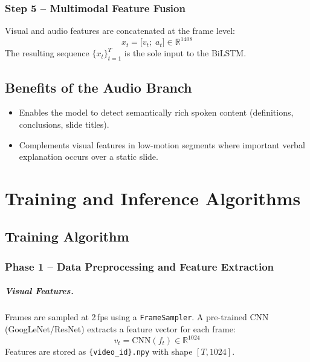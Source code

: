 \documentclass[12pt, a4paper]{report}
\begin{document}
\subsection{Step 5 -- Multimodal Feature Fusion}
Visual and audio features are concatenated at the frame level:
\begin{equation}
  x_t = \bigl[v_t;\; a_t\bigr] \in \mathbb{R}^{1408}
\end{equation}
The resulting sequence $\{x_t\}_{t=1}^{T}$ is the sole input to the BiLSTM.

\section{Benefits of the Audio Branch}
\begin{itemize}
  \item Enables the model to detect semantically rich spoken content (definitions,
        conclusions, slide titles).
  \item Complements visual features in low-motion segments where important verbal
        explanation occurs over a static slide.
\end{itemize}

\chapter{Training and Inference Algorithms}

\section{Training Algorithm}

\subsection{Phase 1 -- Data Preprocessing and Feature Extraction}

\paragraph{Visual Features.}
Frames are sampled at 2\,fps using a \texttt{FrameSampler}. A pre-trained CNN
(GoogLeNet/ResNet) extracts a feature vector for each frame:
\begin{equation}
  v_t = \mathrm{CNN}(f_t) \in \mathbb{R}^{1024}
\end{equation}
Features are stored as \texttt{\{video\_id\}.npy} with shape $[T, 1024]$.
\end{document}
